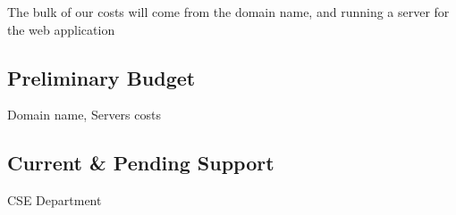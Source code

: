 The bulk of our costs will come from the domain name, and running a server for the web application 

\subsection{Preliminary Budget}
Domain name, 
Servers costs

\subsection{Current \& Pending Support}
CSE Department